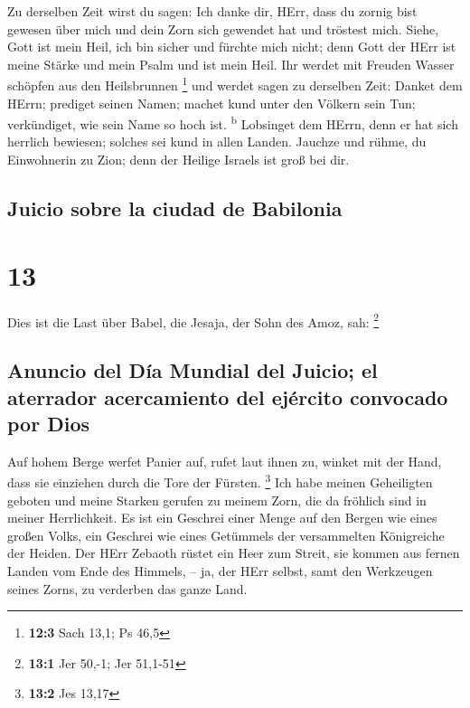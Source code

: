  Zu derselben Zeit wirst du sagen: Ich danke dir, HErr,
dass du zornig bist gewesen über mich und dein Zorn sich gewendet hat
und tröstest mich.  Siehe, Gott ist mein Heil, ich bin
sicher und fürchte mich nicht; denn Gott der HErr ist meine Stärke und
mein Psalm und ist mein Heil.  Ihr werdet mit Freuden
Wasser schöpfen aus den Heilsbrunnen \footnote{\textbf{12:3} Sach 13,1;
  Ps 46,5}  und werdet sagen zu derselben Zeit: Danket dem
HErrn; prediget seinen Namen; machet kund unter den Völkern sein Tun;
verkündiget, wie sein Name so hoch ist. \textsuperscript{b}
 Lobsinget dem HErrn, denn er hat sich herrlich bewiesen;
solches sei kund in allen Landen.  Jauchze und rühme, du
Einwohnerin zu Zion; denn der Heilige Israels ist groß bei dir.

\hypertarget{juicio-sobre-la-ciudad-de-babilonia}{%
\subsection{Juicio sobre la ciudad de
Babilonia}\label{juicio-sobre-la-ciudad-de-babilonia}}

\hypertarget{section-12}{%
\section{13}\label{section-12}}

 Dies ist die Last über Babel, die Jesaja, der Sohn des
Amoz, sah: \footnote{\textbf{13:1} Jer 50,-1; Jer 51,1-51}

\hypertarget{anuncio-del-duxeda-mundial-del-juicio-el-aterrador-acercamiento-del-ejuxe9rcito-convocado-por-dios}{%
\subsection{Anuncio del Día Mundial del Juicio; el aterrador
acercamiento del ejército convocado por
Dios}\label{anuncio-del-duxeda-mundial-del-juicio-el-aterrador-acercamiento-del-ejuxe9rcito-convocado-por-dios}}

 Auf hohem Berge werfet Panier auf, rufet laut ihnen zu,
winket mit der Hand, dass sie einziehen durch die Tore der Fürsten.
\footnote{\textbf{13:2} Jes 13,17}  Ich habe meinen
Geheiligten geboten und meine Starken gerufen zu meinem Zorn, die da
fröhlich sind in meiner Herrlichkeit.  Es ist ein Geschrei
einer Menge auf den Bergen wie eines großen Volks, ein Geschrei wie
eines Getümmels der versammelten Königreiche der Heiden. Der HErr
Zebaoth rüstet ein Heer zum Streit,  sie kommen aus fernen
Landen vom Ende des Himmels, -- ja, der HErr selbst, samt den Werkzeugen
seines Zorns, zu verderben das ganze Land.

